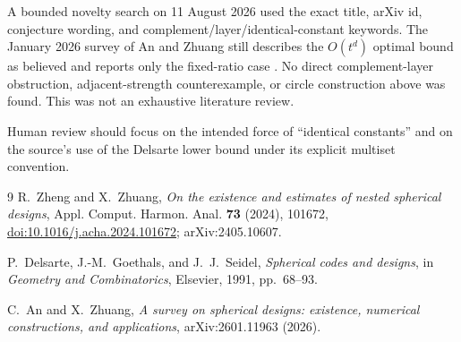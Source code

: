 \documentclass[11pt]{article}
\begin{document}
A bounded novelty search on 11 August 2026 used the exact title, arXiv id,
conjecture wording, and complement/layer/identical-constant keywords.  The
January 2026 survey of An and Zhuang still describes the $O(t^d)$ optimal
bound as believed and reports only the fixed-ratio case \cite{AZ}.  No direct
complement-layer obstruction, adjacent-strength counterexample, or circle
construction above was found.  This was not an exhaustive literature review.

Human review should focus on the intended force of ``identical constants''
and on the source's use of the Delsarte lower bound under its explicit
multiset convention.

\begin{thebibliography}{9}
R.~Zheng and X.~Zhuang,
\emph{On the existence and estimates of nested spherical designs},
Appl. Comput. Harmon. Anal. \textbf{73} (2024), 101672,
\href{https://doi.org/10.1016/j.acha.2024.101672}{doi:10.1016/j.acha.2024.101672};
arXiv:2405.10607.

P.~Delsarte, J.-M.~Goethals, and J.~J.~Seidel,
\emph{Spherical codes and designs}, in \emph{Geometry and Combinatorics},
Elsevier, 1991, pp.~68--93.

C.~An and X.~Zhuang,
\emph{A survey on spherical designs: existence, numerical constructions,
and applications}, arXiv:2601.11963 (2026).
\end{thebibliography}
\endgroup
\end{document}
